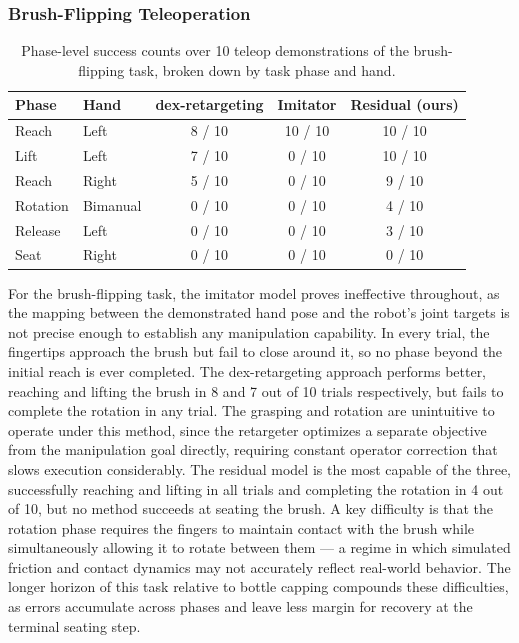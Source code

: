 \subsubsection{Brush-Flipping Teleoperation}

\begin{table}[H]
    \centering
    \begin{tabular}{llccc}
        \toprule
        \textbf{Phase} & \textbf{Hand} & \textbf{dex-retargeting} & \textbf{Imitator} & \textbf{Residual (ours)} \\
        \midrule
        Reach    & Left     &  8 / 10 & 10 / 10 & 10 / 10 \\
        Lift     & Left     &  7 / 10 &  0 / 10 & 10 / 10 \\
        Reach    & Right    &  5 / 10 &  0 / 10 &  9 / 10 \\
        Rotation & Bimanual &  0 / 10 &  0 / 10 &  4 / 10 \\
        Release  & Left     &  0 / 10 &  0 / 10 &  3 / 10 \\
        Seat     & Right    &  0 / 10 &  0 / 10 &  0 / 10 \\
        \bottomrule
    \end{tabular}
    \caption{Phase-level success counts over 10 teleop demonstrations of the
             brush-flipping task, broken down by task phase and hand.}
    \label{tab:teleop_brush_cup}
\end{table}

For the brush-flipping task, the imitator model proves ineffective throughout, as the mapping between the demonstrated hand pose and the robot's joint targets is not precise enough to establish any manipulation capability. In every trial, the fingertips approach the brush but fail to close around it, so no phase beyond the initial reach is ever completed. The dex-retargeting approach performs better, reaching and lifting the brush in 8 and 7 out of 10 trials respectively, but fails to complete the rotation in any trial. The grasping and rotation are unintuitive to operate under this method, since the retargeter optimizes a separate objective from the manipulation goal directly, requiring constant operator correction that slows execution considerably. The residual model is the most capable of the three, successfully reaching and lifting in all trials and completing the rotation in 4 out of 10, but no method succeeds at seating the brush. A key difficulty is that the rotation phase requires the fingers to maintain contact with the brush while simultaneously allowing it to rotate between them — a regime in which simulated friction and contact dynamics may not accurately reflect real-world behavior. The longer horizon of this task relative to bottle capping compounds these difficulties, as errors accumulate 
across phases and leave less margin for recovery at the terminal seating step.
